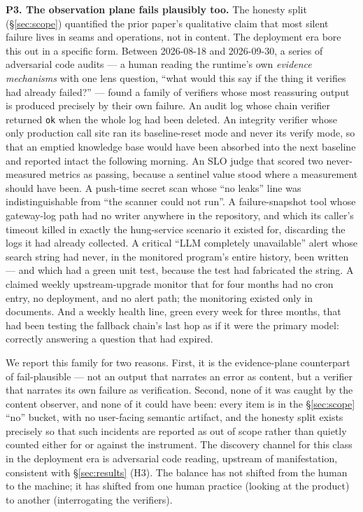 \documentclass[11pt]{article}
\begin{document}
\textbf{P3. The observation plane fails plausibly too.} The honesty
split (\S\ref{sec:scope}) quantified the prior paper's qualitative claim
that most silent failure lives in seams and operations, not in content.
The deployment era bore this out in a specific form. Between 2026-08-18
and 2026-09-30, a series of adversarial code audits --- a human reading
the runtime's own \emph{evidence mechanisms} with one lens question,
``what would this say if the thing it verifies had already failed?'' ---
found a family of verifiers whose most reassuring output is produced
precisely by their own failure. An audit log whose chain verifier
returned \texttt{ok} when the whole log had been deleted. An integrity
verifier whose only production call site ran its baseline-reset mode and
never its verify mode, so that an emptied knowledge base would have been
absorbed into the next baseline and reported intact the following
morning. An SLO judge that scored two never-measured metrics as passing,
because a sentinel value stood where a measurement should have been. A
push-time secret scan whose ``no leaks'' line was indistinguishable from
``the scanner could not run''. A failure-snapshot tool whose gateway-log
path had no writer anywhere in the repository, and which its caller's
timeout killed in exactly the hung-service scenario it existed for,
discarding the logs it had already collected. A critical ``LLM
completely unavailable'' alert whose search string had never, in the
monitored program's entire history, been written --- and which had a
green unit test, because the test had fabricated the string. A claimed
weekly upstream-upgrade monitor that for four months had no cron entry,
no deployment, and no alert path; the monitoring existed only in
documents. And a weekly health line, green every week for three months,
that had been testing the fallback chain's last hop as if it were the
primary model: correctly answering a question that had expired.

We report this family for two reasons. First, it is the evidence-plane
counterpart of fail-plausible --- not an output that narrates an error
as content, but a verifier that narrates its own failure as
verification. Second, none of it was caught by the content observer,
and none of it could have been: every item is in the
\S\ref{sec:scope} ``no'' bucket, with no user-facing semantic artifact,
and the honesty split exists precisely so that such incidents are
reported as out of scope rather than quietly counted either for or
against the instrument. The discovery channel for this class in the
deployment era is adversarial code reading, upstream of manifestation,
consistent with \S\ref{sec:results} (H3). The balance has not shifted
from the human to the machine; it has shifted from one human practice
(looking at the product) to another (interrogating the verifiers).
\end{document}
